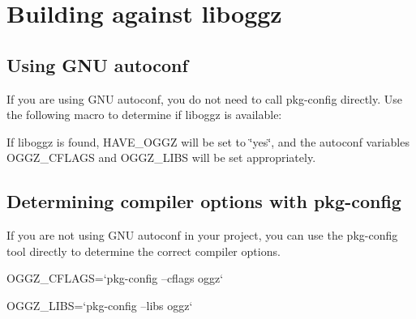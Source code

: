 \section{Building against liboggz}
\label{group__building}
\subsection{Using GNU autoconf}\label{group__building_autoconf}
If you are using GNU autoconf, you do not need to call pkg-\/config directly. Use the following macro to determine if liboggz is available:




If liboggz is found, HAVE\_\-OGGZ will be set to \char`\"{}yes\char`\"{}, and the autoconf variables OGGZ\_\-CFLAGS and OGGZ\_\-LIBS will be set appropriately.\subsection{Determining compiler options with pkg-\/config}\label{group__building_pkg-config}
If you are not using GNU autoconf in your project, you can use the pkg-\/config tool directly to determine the correct compiler options.


\begin{DoxyPre}
 OGGZ\_CFLAGS=`pkg-config --cflags oggz`\end{DoxyPre}



\begin{DoxyPre} OGGZ\_LIBS=`pkg-config --libs oggz`
 \end{DoxyPre}
 
